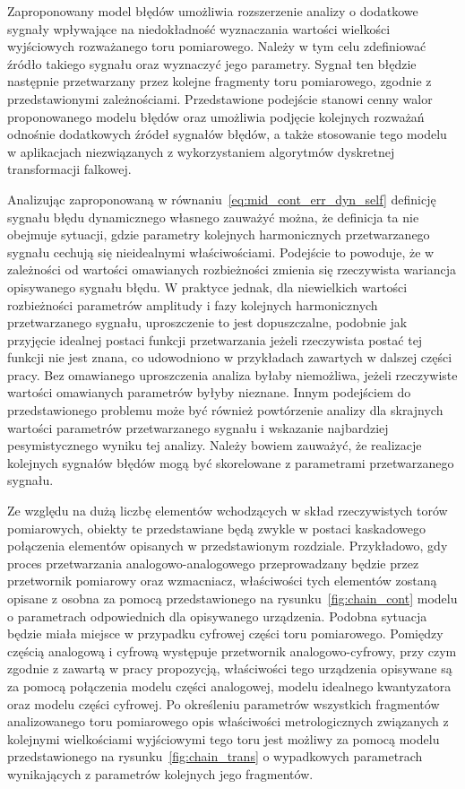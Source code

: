 Zaproponowany model błędów umożliwia rozszerzenie analizy o dodatkowe sygnały wpływające na niedokładność wyznaczania wartości wielkości wyjściowych rozważanego toru pomiarowego. Należy w tym celu zdefiniować źródło takiego sygnału oraz wyznaczyć jego parametry. Sygnał ten błędzie następnie przetwarzany przez kolejne fragmenty toru pomiarowego, zgodnie z przedstawionymi zależnościami. Przedstawione podejście stanowi cenny walor proponowanego modelu błędów oraz umożliwia podjęcie kolejnych rozważań odnośnie dodatkowych źródeł sygnałów błędów, a także stosowanie tego modelu w aplikacjach niezwiązanych z wykorzystaniem algorytmów dyskretnej transformacji falkowej.

Analizując zaproponowaną w równaniu~\eqref{eq:mid_cont_err_dyn_self} definicję sygnału błędu dynamicznego własnego zauważyć można, że definicja ta nie obejmuje sytuacji, gdzie parametry kolejnych harmonicznych przetwarzanego sygnału cechują się nieidealnymi właściwościami. Podejście to powoduje, że w zależności od wartości omawianych rozbieżności zmienia się rzeczywista wariancja opisywanego sygnału błędu. W praktyce jednak, dla niewielkich wartości rozbieżności parametrów amplitudy i fazy kolejnych harmonicznych przetwarzanego sygnału, uproszczenie to jest dopuszczalne, podobnie jak przyjęcie idealnej postaci funkcji przetwarzania jeżeli rzeczywista postać tej funkcji nie jest znana, co udowodniono w przykładach zawartych w dalszej części pracy. Bez omawianego uproszczenia analiza byłaby niemożliwa, jeżeli rzeczywiste wartości omawianych parametrów byłyby nieznane. Innym podejściem do przedstawionego problemu może być również powtórzenie analizy dla skrajnych wartości parametrów przetwarzanego sygnału i wskazanie najbardziej pesymistycznego wyniku tej analizy. Należy bowiem zauważyć, że realizacje kolejnych sygnałów błędów mogą być skorelowane z parametrami przetwarzanego sygnału.

Ze względu na dużą liczbę elementów wchodzących w skład rzeczywistych torów pomiarowych, obiekty te przedstawiane będą zwykle w postaci kaskadowego połączenia elementów opisanych w przedstawionym rozdziale. Przykładowo, gdy proces przetwarzania analogowo-analogowego przeprowadzany będzie przez przetwornik pomiarowy oraz wzmacniacz, właściwości tych elementów zostaną opisane z osobna za pomocą przedstawionego na rysunku~\ref{fig:chain_cont} modelu o parametrach odpowiednich dla opisywanego urządzenia. Podobna sytuacja będzie miała miejsce w przypadku cyfrowej części toru pomiarowego. Pomiędzy częścią analogową i cyfrową występuje przetwornik analogowo-cyfrowy, przy czym zgodnie z zawartą w pracy propozycją, właściwości tego urządzenia opisywane są za pomocą połączenia modelu części analogowej, modelu idealnego kwantyzatora oraz modelu części cyfrowej. Po określeniu parametrów wszystkich fragmentów analizowanego toru pomiarowego opis właściwości metrologicznych związanych z kolejnymi wielkościami wyjściowymi tego toru jest możliwy za pomocą modelu przedstawionego na rysunku~\ref{fig:chain_trans} o wypadkowych parametrach wynikających z parametrów kolejnych jego fragmentów.

